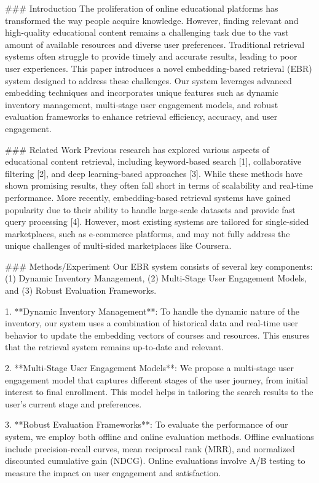 ### Introduction
The proliferation of online educational platforms has transformed the way people acquire knowledge. However, finding relevant and high-quality educational content remains a challenging task due to the vast amount of available resources and diverse user preferences. Traditional retrieval systems often struggle to provide timely and accurate results, leading to poor user experiences. This paper introduces a novel embedding-based retrieval (EBR) system designed to address these challenges. Our system leverages advanced embedding techniques and incorporates unique features such as dynamic inventory management, multi-stage user engagement models, and robust evaluation frameworks to enhance retrieval efficiency, accuracy, and user engagement.

### Related Work
Previous research has explored various aspects of educational content retrieval, including keyword-based search [1], collaborative filtering [2], and deep learning-based approaches [3]. While these methods have shown promising results, they often fall short in terms of scalability and real-time performance. More recently, embedding-based retrieval systems have gained popularity due to their ability to handle large-scale datasets and provide fast query processing [4]. However, most existing systems are tailored for single-sided marketplaces, such as e-commerce platforms, and may not fully address the unique challenges of multi-sided marketplaces like Coursera.

### Methods/Experiment
Our EBR system consists of several key components: (1) Dynamic Inventory Management, (2) Multi-Stage User Engagement Models, and (3) Robust Evaluation Frameworks. 

1. **Dynamic Inventory Management**: To handle the dynamic nature of the inventory, our system uses a combination of historical data and real-time user behavior to update the embedding vectors of courses and resources. This ensures that the retrieval system remains up-to-date and relevant.

2. **Multi-Stage User Engagement Models**: We propose a multi-stage user engagement model that captures different stages of the user journey, from initial interest to final enrollment. This model helps in tailoring the search results to the user's current stage and preferences.

3. **Robust Evaluation Frameworks**: To evaluate the performance of our system, we employ both offline and online evaluation methods. Offline evaluations include precision-recall curves, mean reciprocal rank (MRR), and normalized discounted cumulative gain (NDCG). Online evaluations involve A/B testing to measure the impact on user engagement and satisfaction.

